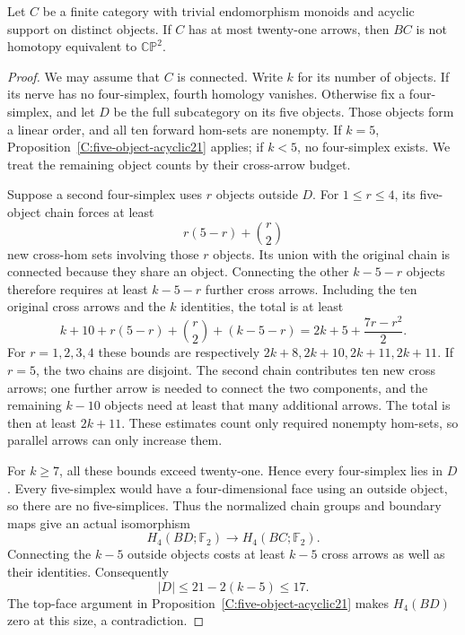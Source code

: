 \begin{theorem}
\label{C:all-acyclic21}
Let $C$ be a finite category with trivial endomorphism monoids
and acyclic support on distinct objects.  If $C$ has at most
twenty-one arrows, then $BC$ is not homotopy equivalent to
$\mathbb {CP}^2$.
\end{theorem}
\begin{proof}
We may assume that $C$ is connected.  Write $k$ for its number
of objects.  If its nerve has no four-simplex, fourth homology
vanishes.  Otherwise fix a four-simplex, and let $D$ be the
full subcategory on its five objects.  Those objects form a
linear order, and all ten forward hom-sets are nonempty.
If $k=5$, Proposition~\ref{C:five-object-acyclic21} applies;
if $k<5$, no four-simplex exists.  We treat the remaining
object counts by their cross-arrow budget.

Suppose a second four-simplex uses $r$ objects outside $D$.
For $1\leq r\leq4$, its five-object chain forces at least
\[
 r(5-r)+\binom r2
\]
new cross-hom sets involving those $r$ objects.  Its union
with the original chain is connected because they share an
object.  Connecting the other $k-5-r$ objects therefore
requires at least $k-5-r$ further cross arrows.  Including
the ten original cross arrows and the $k$ identities, the
total is at least
\begin{equation}\label{C:outside-four-simplex-cost}
 k+10+r(5-r)+\binom r2+(k-5-r)
 =2k+5+\frac{7r-r^2}{2}.
\end{equation}
For $r=1,2,3,4$ these bounds are respectively
$2k+8,2k+10,2k+11,2k+11$.  If $r=5$, the two chains are
disjoint.  The second chain contributes ten new cross arrows;
one further arrow is needed to connect the two components,
and the remaining $k-10$ objects need at least that many
additional arrows.  The total is then at least $2k+11$.
These estimates count only required nonempty hom-sets, so
parallel arrows can only increase them.

For $k\geq7$, all these bounds exceed twenty-one.  Hence
every four-simplex lies in $D$.  Every five-simplex would
have a four-dimensional face using an outside object, so
there are no five-simplices.  Thus the normalized chain
groups and boundary maps give an actual isomorphism
\[
 H_4(BD;\mathbb F_2)\longrightarrow H_4(BC;\mathbb F_2).
\]
Connecting the $k-5$ outside objects costs at least $k-5$
cross arrows as well as their identities.  Consequently
\[
 |D|\leq21-2(k-5)\leq17.
\]
The top-face argument in
Proposition~\ref{C:five-object-acyclic21} makes $H_4(BD)$
zero at this size, a contradiction.


\end{proof}
